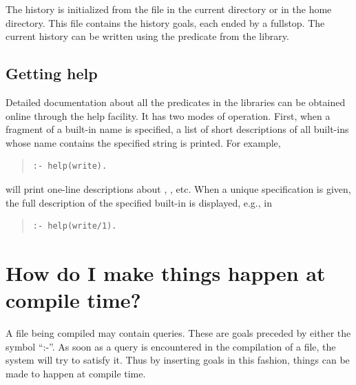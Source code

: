The history is initialized from the file 
in the current directory or in the home directory.
This file contains the history goals, each ended by a fullstop.
The current history can be written using the predicate
 from the
 library.

\subsection{Getting help}
Detailed documentation about all the predicates in the {\eclipse} libraries
can be obtained online through the help facility.
It has two modes of operation.
First, when a fragment of a built-in name is specified, a list of short
descriptions of all built-ins whose name contains the specified string
is printed.
For example,
\begin{quote}
\begin{verbatim}
:- help(write).
\end{verbatim}
\end{quote}
will print one-line descriptions about ,
, etc.
When a unique specification is given, the full description of the
specified built-in is displayed, e.g., in
\begin{quote}
\begin{verbatim}
:- help(write/1).
\end{verbatim}
\end{quote}

\section{How do I make things happen at compile time?}

A file being compiled may contain queries.  These are goals
preceded by either the symbol ``:-''.
As soon as a query is encountered in the compilation of a file,
the {\eclipse} system will try to satisfy it.
Thus by inserting goals in this fashion, things can be made to happen at
compile time.

